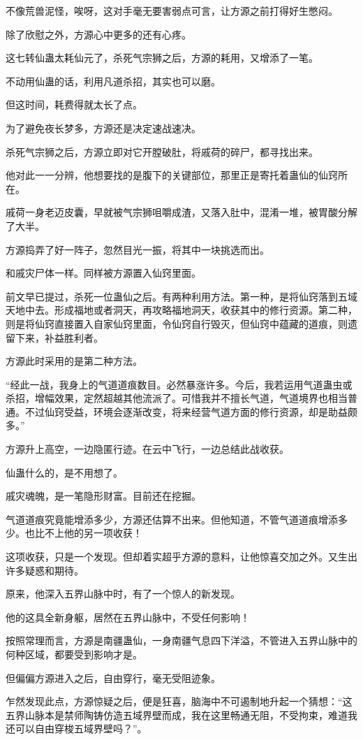 \begin{this_body}
不像荒兽泥怪，唉呀，这对手毫无要害弱点可言，让方源之前打得好生憋闷。

除了欣慰之外，方源心中更多的还有心疼。

这七转仙蛊太耗仙元了，杀死气宗狮之后，方源的耗用，又增添了一笔。

不动用仙蛊的话，利用凡道杀招，其实也可以磨。

但这时间，耗费得就太长了点。

为了避免夜长梦多，方源还是决定速战速决。

杀死气宗狮之后，方源立即对它开膛破肚，将戚荷的碎尸，都寻找出来。

他对此一一分辨，他想要找的是腹下的关键部位，那里正是寄托着蛊仙的仙窍所在。

戚荷一身老迈皮囊，早就被气宗狮咀嚼成渣，又落入肚中，混淆一堆，被胃酸分解了大半。

方源捣弄了好一阵子，忽然目光一振，将其中一块挑选而出。

和戚灾尸体一样。同样被方源置入仙窍里面。

前文早已提过，杀死一位蛊仙之后。有两种利用方法。第一种，是将仙窍落到五域天地中去。形成福地或者洞天，再攻略福地洞天，收获其中的修行资源。第二种，则是将仙窍直接置入自家仙窍里面，令仙窍自行毁灭，但仙窍中蕴藏的道痕，则遗留下来，补益胜利者。

方源此时采用的是第二种方法。

“经此一战，我身上的气道道痕数目。必然暴涨许多。今后，我若运用气道蛊虫或杀招，增幅效果，定然超越其他流派了。可惜我并不擅长气道，气道境界也相当普通。不过仙窍受益，环境会逐渐改变，将来经营气道方面的修行资源，却是助益颇多。”

方源升上高空，一边隐匿行迹。在云中飞行，一边总结此战收获。

仙蛊什么的，是不用想了。

戚灾魂魄，是一笔隐形财富。目前还在挖掘。

气道道痕究竟能增添多少，方源还估算不出来。但他知道，不管气道道痕增添多少。也比不上他的另一项收获！

这项收获，只是一个发现。但却着实超乎方源的意料，让他惊喜交加之外。又生出许多疑惑和期待。

原来，他深入五界山脉中时，有了一个惊人的新发现。

他的这具全新身躯，居然在五界山脉中，不受任何影响！

按照常理而言，方源是南疆蛊仙，一身南疆气息四下洋溢，不管进入五界山脉中的何种区域，都要受到影响才是。

但偏偏方源进入之后，自由穿行，毫无受阻迹象。

乍然发现此点，方源惊疑之后，便是狂喜，脑海中不可遏制地升起一个猜想：“这五界山脉本是禁师陶铸仿造五域界壁而成，我在这里畅通无阻，不受拘束，难道我还可以自由穿梭五域界壁吗？”。


\end{this_body}
